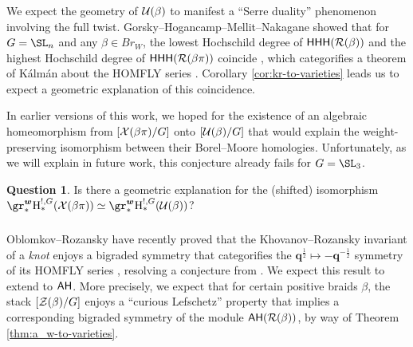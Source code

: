 \documentclass[a4paper,10pt,leqno]{amsart}
\theoremstyle{plain}
\theoremstyle{plain}
\theoremstyle{plain}
\theoremstyle{definition}
\newtheorem{quest}[mainthm]{Question}
\theoremstyle{remark}
\newcommand{\Br}{\mathit{Br}}
\newcommand{\Q}{\bm{q}}
\begin{document}
\subsubsection{}\label{subsubsec:serre-duality}

We expect the geometry of $\cal{U}(\beta)$ to manifest a ``Serre duality'' phenomenon involving the full twist.
Gorsky--Hogancamp--Mellit--Nakagane showed that for $G = \SL_n$ and any $\beta \in \Br_W$, the lowest Hochschild degree of $\sf{HHH}(\cal{R}(\beta))$ and the highest Hochschild degree of $\sf{HHH}(\cal{R}(\beta \pi))$ coincide \cite{ghmn}, which categorifies a theorem of K\'alm\'an about the HOMFLY series \cite{kalman}.
Corollary \ref{cor:kr-to-varieties} leads us to expect a geometric explanation of this coincidence.

In earlier versions of this work, we hoped for the existence of an algebraic homeomorphism from $[\cal{X}(\beta\pi)/G]$ onto $[\cal{U}(\beta)/G]$ that would explain the weight-preserving isomorphism between their Borel--Moore homologies.
Unfortunately, as we will explain in future work, this conjecture already fails for $G = \SL_3$.

\begin{quest}
Is there a geometric explanation for the (shifted) isomorphism $\gr_\ast^{\bm{w}} \ur{H}_\ast^{!, G}(\cal{X}(\beta\pi)) \simeq \gr_\ast^{\bm{w}} \ur{H}_\ast^{!, G}(\cal{U}(\beta))$?
\end{quest}

\subsubsection{}

Oblomkov--Rozansky have recently proved that the Khovanov--Rozansky invariant of a \emph{knot} enjoys a bigraded symmetry that categorifies the $\Q^{\frac{1}{2}} \mapsto -\Q^{-\frac{1}{2}}$ symmetry of its HOMFLY series \cite{or}, resolving a conjecture from \cite{dgr}.
We expect this result to extend to $\sf{AH}$.
More precisely, we expect that for certain positive braids $\beta$, the stack $[\cal{Z}(\beta)/G]$ enjoys a ``curious Lefschetz'' property that implies a corresponding bigraded symmetry of the module $\sf{AH}(\cal{R}(\beta))$, by way of Theorem \ref{thm:a_w-to-varieties}.
\end{document}
